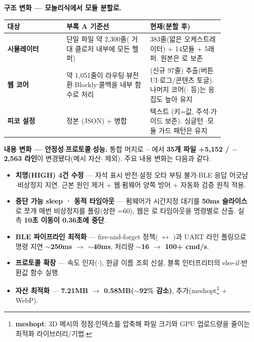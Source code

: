 \smallskip
\noindent\textbf{구조 변화 --- 모놀리식에서 모듈 분할로.}
\begin{center}
\renewcommand{\arraystretch}{1.3}
\begin{tabularx}{\linewidth}{@{}>{\sffamily\bfseries}L{0.24\linewidth} L{0.34\linewidth} L{0.30\linewidth}@{}}
\toprule
대상 & 부록 A 기준선 & 현재(분할 후) \\
\midrule
시뮬레이터 &  단일 파일 약 2{,}300줄( 거대 클로저 내부에 모든 헬퍼) &  383줄(얇은 오케스트레이터) +  14모듈 +  5래퍼. 원본은 로 보존 \\
웹 코어 &  약 1{,}051줄이 라우팅$\cdot$뷰전환$\cdot$Blockly$\cdot$콜백을 내부 함수로 처리 & (신규 97줄) 추출(버튼 UI$\cdot$로그/콘텐츠 토글). 나머지 코어($\cdot$ 등)는 응집도 높아 유지 \\
피코 설정 & 정본 (JSON) +  병합 & 텍스트 (키=값, 주석$\cdot$가이드 보존). 싱글턴 $\cdot$모듈 가드 패턴은 유지 \\
\bottomrule
\end{tabularx}
\end{center}

\smallskip
\noindent\textbf{내용 변화 --- 안정성$\cdot$프로토콜$\cdot$성능.} 통합 머지로 $\cdot$$\cdot$%
에서 \textbf{35개 파일 +5{,}152 / $-$2{,}563 라인}이 변경됐다(메시 자산$\cdot$
제외). 주요 내용 변화는 다음과 같다.
\begin{itemize}
  \item \textbf{치명(HIGH) 4건 수정} --- 자석 표시 반전$\cdot$설정 오타 부팅 불가$\cdot$BLE 응답
  어긋남$\cdot$비상정지 지연. 근본 원인 제거 + 웹$\cdot$펌웨어 양쪽 방어 + 자동화 검증 원칙 적용.
  \item \textbf{중단 가능 sleep · 동적 타임아웃} --- 펌웨어가 시간지정 대기를 \textbf{50ms 슬라이스}로
  쪼개 매번 비상정지를 폴링(상한 =60), 웹은 로
  타임아웃을 명령별로 산출. 실측 \textbf{10초 이동이 0.36초에 중단}.
  \item \textbf{BLE 파이프라인 최적화} --- fire-and-forget 정책( $\leftrightarrow$
  )과 UART 라인 폴링으로 명령 지연 \textbf{$\sim$250ms $\to$ $\sim$40ms},
  처리량 \textbf{$\sim$16 $\to$ 100+ cmd/s}.
  \item \textbf{프로토콜 확장} --- 속도 인자($\cdot$),
  한글 이름 조회  신설, 블록 인터프리터의 else-if$\cdot$반환값 함수 실행.
  \item \textbf{자산 최적화} ---  \textbf{7.21MB $\to$ 0.58MB($\sim$92\% 감소)},
   추가(meshopt\footnote{\textbf{meshopt}: 3D 메시의 정점$\cdot$인덱스를 압축해 파일 크기와 GPU 업로드량을 줄이는 최적화 라이브러리/기법.} + WebP).
\end{itemize}

